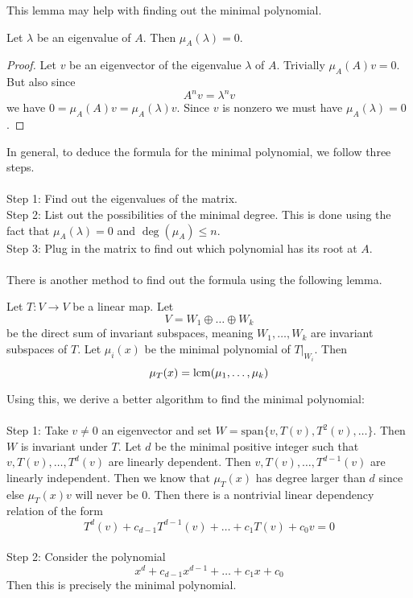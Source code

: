 \documentclass[a4paper]{article}
\begin{document}
This lemma may help with finding out the minimal polynomial. 

\begin{lmm}{}{} Let $\lambda$ be an eigenvalue of $A$. Then $\mu_A(\lambda)=0$. \tcbline
\begin{proof}
Let $v$ be an eigenvector of the eigenvalue $\lambda$ of $A$. Trivially $\mu_A(A)v=0$. But also since $$A^nv=\lambda^nv$$ we have $0=\mu_A(A)v=\mu_A(\lambda)v$. Since $v$ is nonzero we must have $\mu_A(\lambda)=0$. 
\end{proof}
\end{lmm}

In general, to deduce the formula for the minimal polynomial, we follow three steps. \\~\\
Step 1: Find out the eigenvalues of the matrix. \\
Step 2: List out the possibilities of the minimal degree. This is done using the fact that $\mu_A(\lambda)=0$ and $\deg(\mu_A)\leq n$. \\
Step 3: Plug in the matrix to find out which polynomial has its root at $A$. \\~\\
There is another method to find out the formula using the following lemma. 

\begin{lmm}{}{} Let $T:V\to V$ be a linear map. Let $$V=W_1\oplus\dots\oplus W_k$$ be the direct sum of invariant subspaces, meaning $W_1,\dots,W_k$ are invariant subspaces of $T$. Let $\mu_i(x)$ be the minimal polynomial of $T|_{W_i}$. Then $$\mu_T(x)=\operatorname{lcm}(\mu_1,\dots,\mu_k)$$
\end{lmm}

Using this, we derive a better algorithm to find the minimal polynomial: \\~\\
Step 1: Take $v\neq 0$ an eigenvector and set $W=\text{span}\{v,T(v),T^2(v),\dots\}$. Then $W$ is invariant under $T$. Let $d$ be the minimal positive integer such that $v,T(v),\dots,T^d(v)$ are linearly dependent. Then $v,T(v),\dots,T^{d-1}(v)$ are linearly independent. Then we know that $\mu_T(x)$ has degree larger than $d$ since else $\mu_T(x)v$ will never be $0$. Then there is a nontrivial linear dependency relation of the form $$T^d(v)+c_{d-1}T^{d-1}(v)+\dots+c_1T(v)+c_0v=0$$\\
Step 2: Consider the polynomial $$x^d+c_{d-1}x^{d-1}+\dots+c_1x+c_0$$ Then this is precisely the minimal polynomial. 
\end{document}
